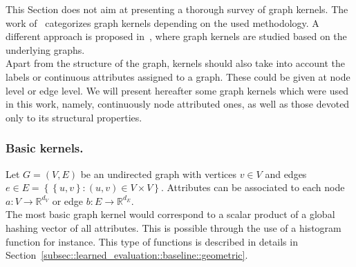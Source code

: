         This Section does not aim at presenting a thorough survey of graph kernels.
        The work of~\textcite{ghosh2018journey} categorizes graph kernels depending on the used methodology.
        A different approach is proposed in~\textcite{kriege2020survey}, where graph kernels are studied based on the underlying graphs.\\

        Apart from the structure of the graph, kernels should also take into account the labels or continuous attributes assigned to a graph.
        These could be given at node level or edge level.
        We will present hereafter some graph kernels which were used in this work, namely, continuously node attributed ones, as well as those devoted only to its structural properties.\\

        \subsubsection{Basic kernels.}
            Let $G = \left(V, E\right)$ be an undirected graph with vertices $v\in V$ and edges $e \in E =\left\{\left\{u, v\right\}: (u, v) \in V\times V\right\}$.
            Attributes can be associated to each node $a: V \rightarrow \mathbb{R}^{d_V}$ or edge $b: E \rightarrow \mathbb{R}^{d_E}$.\\

            The most basic graph kernel would correspond to a scalar product of a global hashing vector of all attributes.
            This is possible through the use of a histogram function for instance.
            This type of functions is described in details in Section~\ref{subsec::learned_evaluation::baseline::geometric}.\\

